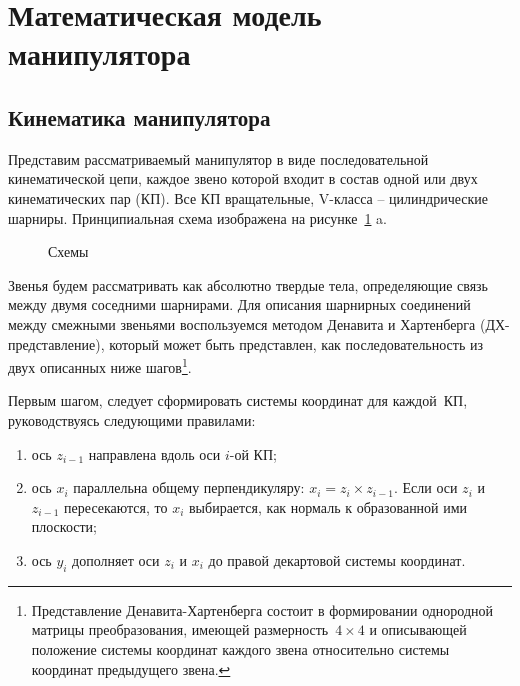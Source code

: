 \section{Математическая модель манипулятора}\label{part_math_model_of_robot}

\subsection{Кинематика манипулятора}\label{part_kinematics}

Представим рассматриваемый манипулятор в виде последовательной кинематической цепи, каждое звено которой входит в состав одной или двух кинематических пар (КП). Все КП вращательные, V-класса -- цилиндрические шарниры. Принципиальная схема изображена на рисунке~\ref{img:kinematics} a.

\begin{figure}[h!]
	\begin{minipage}[h]{0.5\linewidth}
	\end{minipage}
	\hfill
	\begin{minipage}[h]{0.5\linewidth}
	\end{minipage}
	\caption{Схемы}
	\label{img:kinematics}
\end{figure}

Звенья будем рассматривать как абсолютно твердые тела, определяющие связь между двумя соседними шарнирами. Для описания шарнирных соединений между смежными звеньями воспользуемся методом Денавита и Хартенберга (ДХ-представление), который может быть представлен, как последовательность из двух описанных ниже шагов\footnote{Представление Денавита-Хартенберга состоит в формировании однородной матрицы преобразования, имеющей размерность~$4 \times 4$ и описывающей положение системы координат каждого звена относительно системы координат предыдущего звена.}.


Первым шагом, следует сформировать системы координат для каждой~КП, руководствуясь следующими правилами:

\begin{enumerate}
	\item ось $z_{i-1}$ направлена вдоль оси $i$-ой КП;
	\item ось $x_i$ параллельна общему перпендикуляру: $x_i = z_i \times z_{i-1}$. Если оси $z_i$ и $z_{i-1}$ пересекаются, то $x_i$ выбирается, как нормаль к образованной ими плоскости;
	
	\item ось $y_i$ дополняет оси $z_i$ и $x_i$ до правой декартовой системы координат. 
\end{enumerate}

